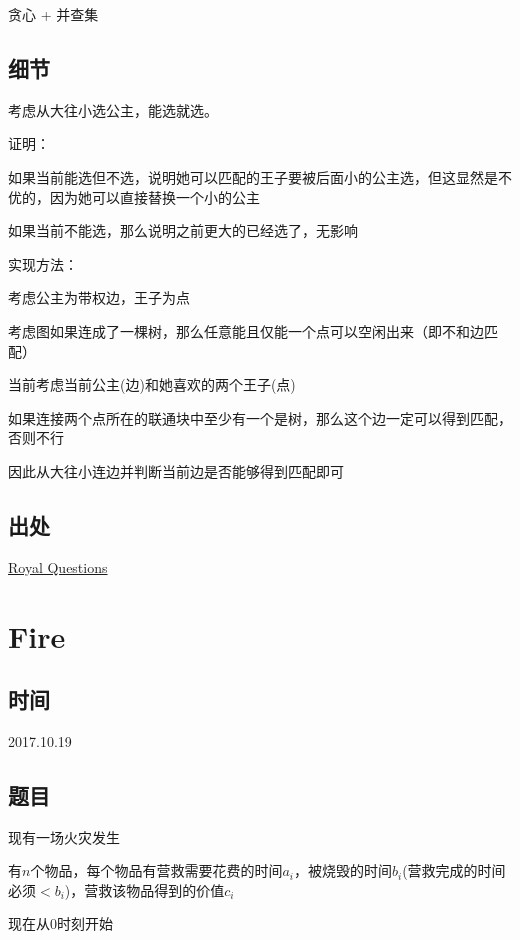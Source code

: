 \documentclass[a4paper]{article}
\begin{document}
		贪心 + 并查集
		
	\subsection{细节}
		
		考虑从大往小选公主，能选就选。
		
		证明：
		
		如果当前能选但不选，说明她可以匹配的王子要被后面小的公主选，但这显然是不优的，因为她可以直接替换一个小的公主
		
		如果当前不能选，那么说明之前更大的已经选了，无影响
		
		实现方法：
		
		考虑公主为带权边，王子为点
		
		考虑图如果连成了一棵树，那么任意能且仅能一个点可以空闲出来（即不和边匹配）
		
		当前考虑当前公主(边)和她喜欢的两个王子(点)
		
		如果连接两个点所在的联通块中至少有一个是树，那么这个边一定可以得到匹配，否则不行
		
		因此从大往小连边并判断当前边是否能够得到匹配即可
		
	\subsection{出处}
		
		\href {http://codeforces.com/problemset/problem/875/F}{Royal Questions}
		
	
	\newpage
	
	\section{Fire}
		
	\subsection{时间}
	
		2017.10.19
	
	\subsection{题目}
		
		现有一场火灾发生
		
		有$n$个物品，每个物品有营救需要花费的时间$a_i$，被烧毁的时间$b_i$(营救完成的时间必须$< b_i$)，营救该物品得到的价值$c_i$
		
		现在从0时刻开始
		
\end{document}

